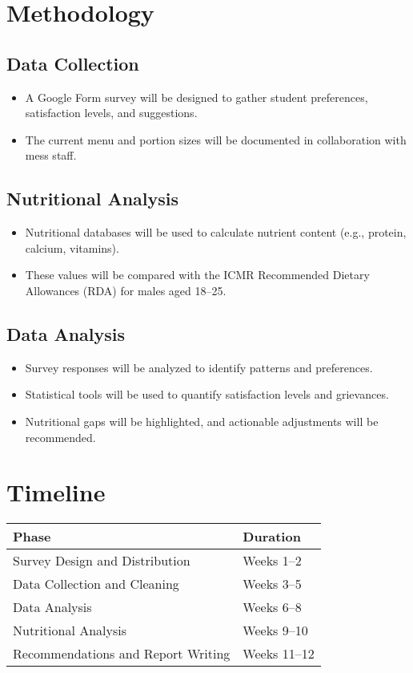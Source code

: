 \documentclass[12pt,a4paper]{article}
\begin{document}
\section{Methodology}
\subsection{Data Collection}
\begin{itemize}
    \item A Google Form survey will be designed to gather student preferences, satisfaction levels, and suggestions.
    \item The current menu and portion sizes will be documented in collaboration with mess staff.
\end{itemize}

\subsection{Nutritional Analysis}
\begin{itemize}
    \item Nutritional databases will be used to calculate nutrient content (e.g., protein, calcium, vitamins).
    \item These values will be compared with the ICMR Recommended Dietary Allowances (RDA) for males aged 18--25.
\end{itemize}

\subsection{Data Analysis}
\begin{itemize}
    \item Survey responses will be analyzed to identify patterns and preferences.
    \item Statistical tools will be used to quantify satisfaction levels and grievances.
    \item Nutritional gaps will be highlighted, and actionable adjustments will be recommended.
\end{itemize}

\section{Timeline}
\begin{tabular}{|l|l|}
\hline
\textbf{Phase} & \textbf{Duration} \\
\hline
Survey Design and Distribution & Weeks 1--2 \\
Data Collection and Cleaning & Weeks 3--5 \\
Data Analysis & Weeks 6--8 \\
Nutritional Analysis & Weeks 9--10 \\
Recommendations and Report Writing & Weeks 11--12 \\
\hline
\end{tabular}
\end{document}
